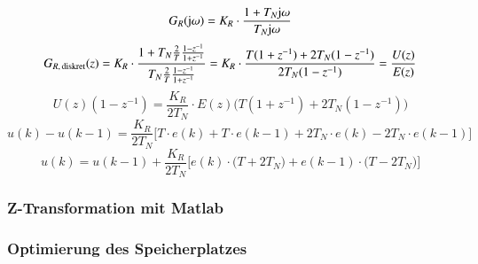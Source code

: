 $$ G_R(\mathrm{j} \omega) = K_R \cdot \frac{1 + T_N \mathrm{j} \omega}{T_N \mathrm{j} \omega} $$
$$ G_{R, \, \rm diskret}(z) = K_R \cdot \frac{1 + T_N \frac{2}{T} \frac{1- z^{-1}}{1 + z^{-1}}}{T_N \frac{2}{T} \frac{1- z^{-1}}{1 + z^{-1}}} 
    = K_R \cdot \frac{T (1 + z^{-1}) + 2 T_N (1 - z^{-1})}{2 T_N (1- z^{-1})} = \frac{U(z)}{E(z)} $$
$$ U(z) (1 - z^{-1}) = \frac{K_R}{2 T_N} \cdot E(z) \Big( T (1 + z^{-1}) + 2 T_N (1 - z^{-1}) \Big) $$
$$ u(k) - u(k-1) = \frac{K_R}{2 T_N} \Big[ T \cdot e(k) + T \cdot e(k-1) + 2 T_N \cdot e(k) - 2 T_N \cdot e(k-1) \Big] $$
$$ u(k) = u(k-1) + \frac{K_R}{2 T_N} \Big[ e(k) \cdot \big( T + 2 T_N  \big) +  e(k-1) \cdot \big( T - 2 T_N  \big)  \Big]  $$


\subsubsection{Z-Transformation mit Matlab}





\subsubsection{Optimierung des Speicherplatzes}